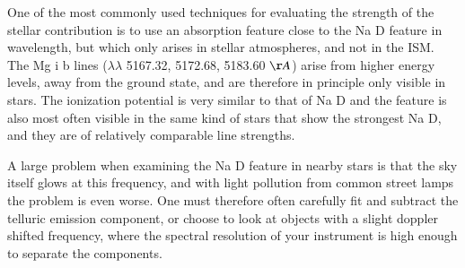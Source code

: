 \documentclass[a4wide,12pt]{book}
\begin{document}
{One of the most commonly used techniques for evaluating the strength of the stellar contribution is to use an absorption feature close to the Na D feature in wavelength, but which only arises in stellar atmospheres, and not in the ISM. The Mg {\sc i} b lines ($\lambda \lambda$ 5167.32, 5172.68, 5183.60 $\AA$) arise from higher energy levels, away from the ground state, and are therefore in principle only visible in stars. The ionization potential is very similar to that of Na D and the feature is also most often visible in the same kind of stars that show the strongest Na D, and they are of relatively comparable line strengths. 

A large problem when examining the Na D feature in nearby stars is that the sky itself glows at this frequency, and with light pollution from common street lamps the problem is even worse. One must therefore often carefully fit and subtract the telluric emission component, or choose to look at objects with a slight doppler shifted frequency, where the spectral resolution of your instrument is high enough to separate the components. 

}
\end{document}
